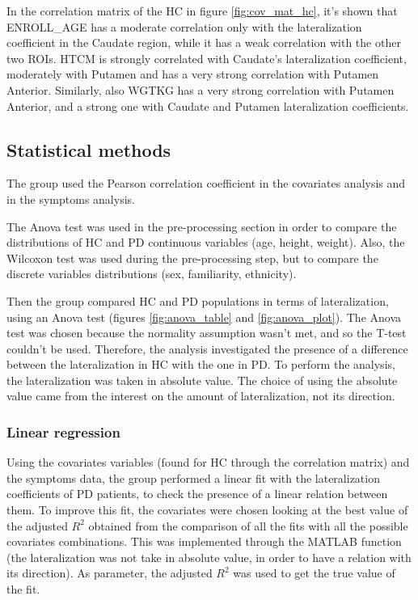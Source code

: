\documentclass[]{article}
\begin{document}
\begin{multicols}{2}

In the correlation matrix of the HC in figure \ref{fig:cov_mat_hc}, it's shown that ENROLL\_AGE has a moderate correlation only with the lateralization coefficient in the Caudate region, while it has a weak correlation with the other two ROIs. HTCM is strongly correlated with Caudate's lateralization coefficient, moderately with Putamen and has a very strong correlation with Putamen Anterior. Similarly, also WGTKG has a very strong correlation with Putamen Anterior, and a strong one with Caudate and Putamen lateralization coefficients.

\subsection{Statistical methods}

The group used the Pearson correlation coefficient in the covariates analysis and in the symptoms analysis.

The Anova test was used in the pre-processing section in order to compare the distributions of HC and PD continuous variables (age, height, weight).
Also, the Wilcoxon test was used during the pre-processing step, but to compare the discrete variables distributions (sex, familiarity, ethnicity).

Then the group compared HC and PD populations in terms of lateralization, using an Anova test (figures \ref{fig:anova_table} and \ref{fig:anova_plot}). The Anova test was chosen because the normality assumption wasn't met, and so the T-test couldn't be used.
Therefore, the analysis investigated the presence of a difference between the lateralization in HC with the one in PD. To perform the analysis, the lateralization was taken in absolute value. The choice of using the absolute value came from the interest on the amount of lateralization, not its direction.

\subsubsection{Linear regression}

Using the covariates variables (found for HC through the correlation matrix) and the symptoms data, the group performed a linear fit with the lateralization coefficients of PD patients, to check the presence of a linear relation between them. To improve this fit, the covariates were chosen looking at the best value of the adjusted $R^2$ obtained from the comparison of all the fits with all the possible covariates combinations. 
This was implemented through the MATLAB function  (the lateralization was not take in absolute value, in order to have a relation with its direction).
As parameter, the adjusted $R^2$ was used to get the true value of the fit.


\end{multicols}
\end{document}
